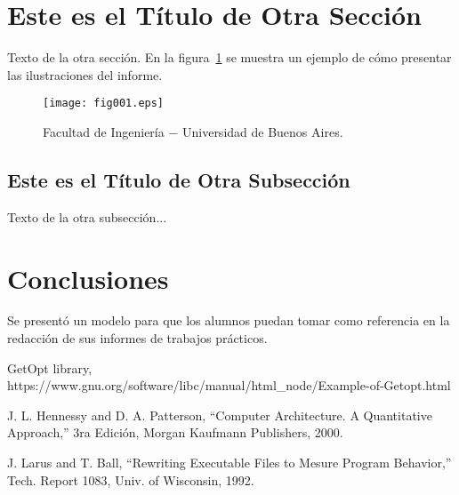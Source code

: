 \documentclass[a4paper]{article}
\begin{document}
\section{Este es el Título de Otra Sección}

Texto de la otra sección. En la figura~\ref{fig001} se muestra un ejemplo de cómo presentar las ilustraciones del informe.

\begin{figure}[!htp]
\begin{center}
\texttt{[image: fig001.eps]}
\caption{Facultad de Ingeniería $-$ Universidad de Buenos Aires.} \label{fig001}
\end{center}
\end{figure}


\subsection{Este es el Título de Otra Subsección}

Texto de la otra subsección...


\section{Conclusiones}

Se presentó un modelo para que los alumnos puedan tomar como referencia en la redacción de sus informes de trabajos prácticos.


\begin{thebibliography}{99}

 GetOpt library, https://www.gnu.org/software/libc/manual/html_node/Example-of-Getopt.html

 J. L. Hennessy and D. A. Patterson, ``Computer Architecture. A Quantitative
Approach,'' 3ra Edición, Morgan Kaufmann Publishers, 2000.

 J. Larus and T. Ball, ``Rewriting Executable Files to Mesure Program Behavior,'' Tech. Report 1083, Univ. of Wisconsin, 1992.

\end{thebibliography}
\end{document}
